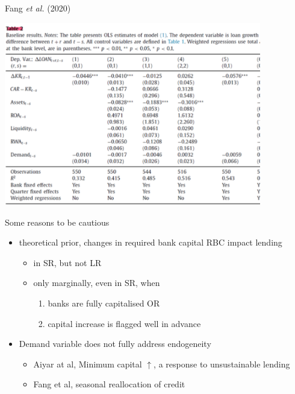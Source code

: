 \documentclass[
  14,
  ignorenonframetext,
  aspectratio=141,
]{beamer}
\begin{document}
\begin{frame}{Fang \emph{et al.} (2020)}
\protect\hypertarget{fang2020bank}{}
\centering

\includegraphics[width=\textwidth, height = 8cm]{FamgEtAl_JBF_2022}
\end{frame}

\begin{frame}{Some reasons to be cautious}
\protect\hypertarget{some-reasons-to-be-cautious}{}
\begin{itemize}
    \item theoretical prior, changes in required bank capital RBC impact lending 
    \begin{itemize}
        \item in SR, but not LR
        \item only marginally, even in SR, when
        \begin{enumerate}
            \item banks are fully capitalised OR
            \item capital increase is flagged well in advance
        \end{enumerate}
    \end{itemize}
    \item Demand variable does not fully address endogeneity
    \begin{itemize}
        \item Aiyar at al, Minimum capital $\uparrow$, a response to unsustainable lending
        \item Fang et al, seasonal reallocation of credit
    \end{itemize}
\end{itemize}
\end{frame}
\end{document}
